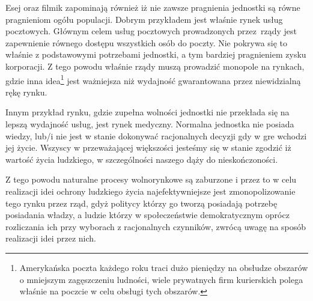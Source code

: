 \documentclass[a4paper,12pt]{article}
\begin{document}
Esej oraz filmik zapominają również iż nie zawsze pragnienia jednostki są równe pragnieniom ogółu populacji. Dobrym przykładem jest właśnie rynek usług pocztowych. Głównym celem usług pocztowych prowadzonych przez rządy jest zapewnienie równego dostępu wszystkich osób do poczty. Nie pokrywa się to właśnie z podstawowymi potrzebami jednostki, a tym bardziej pragnieniem zysku korporacji. Z tego powodu właśnie rządy muszą prowadzić monopole na rynkach, gdzie inna idea\footnote{Amerykańska poczta każdego roku traci dużo pieniędzy na obsłudze obszarów o mniejszym zagęszczeniu ludności, wiele prywatnych firm kurierskich polega właśnie na poczcie w celu obsługi tych obszarów.} jest ważniejsza niż wydajność gwarantowana przez niewidzialną rękę rynku.

Innym przykład rynku, gdzie zupełna wolności jednostki nie przekłada się na lepszą wydajność usług, jest rynek medyczny. Normalna jednostka nie posiada wiedzy, lub/i nie jest w stanie dokonywać racjonalnych decyzji gdy w gre wchodzi jej życie. Wszyscy w przeważającej większości jesteśmy się w stanie zgodzić iż wartość życia ludzkiego, w szczególności naszego dąży do nieskończoności.

Z tego powodu naturalne procesy wolnorynkowe są zaburzone i przez to w celu realizacji idei ochrony ludzkiego życia najefektywniejsze jest zmonopolizowanie tego rynku przez rząd, gdyż politycy którzy go tworzą posiadają potrzebę posiadania władzy, a ludzie którzy w społeczeństwie demokratycznym oprócz rozliczania ich przy wyborach z racjonalnych czynników, zwrócą uwagę na sposób realizacji idei przez nich.
\end{document}
